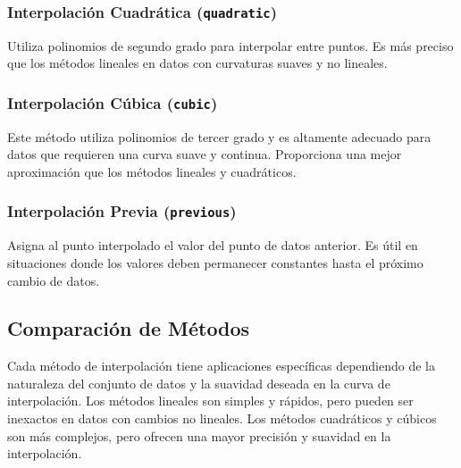 \subsubsection{Interpolación Cuadrática (\texttt{quadratic})}
Utiliza polinomios de segundo grado para interpolar entre puntos. 
Es más preciso que los métodos lineales en datos con curvaturas suaves y no lineales.

\subsubsection{Interpolación Cúbica (\texttt{cubic})}
Este método utiliza polinomios de tercer grado y es altamente adecuado 
para datos que requieren una curva suave y continua. Proporciona una mejor 
aproximación que los métodos lineales y cuadráticos.

\subsubsection{Interpolación Previa (\texttt{previous})}
Asigna al punto interpolado el valor del punto de datos anterior. Es útil en 
situaciones donde los valores deben permanecer constantes hasta el próximo 
cambio de datos.

\subsection{Comparación de Métodos}
Cada método de interpolación tiene aplicaciones específicas dependiendo de la 
naturaleza del conjunto de datos y la suavidad deseada en la curva de interpolación. 
Los métodos lineales son simples y rápidos, pero pueden ser inexactos en datos 
con cambios no lineales. Los métodos cuadráticos y cúbicos son más complejos, 
pero ofrecen una mayor precisión y suavidad en la interpolación.